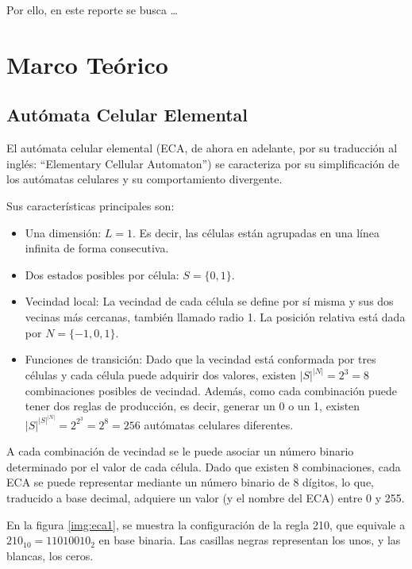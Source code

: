 \documentclass[12pt,twoside]{article}
\begin{document}
	Por ello, en este reporte se busca \dots
	
	\clearpage
	\section{Marco Teórico}
	
	\subsection{Autómata Celular Elemental}
	
	El autómata celular elemental (ECA, de ahora en adelante, por su traducción al inglés: ``Elementary Cellular Automaton'') se caracteriza por su simplificación de los autómatas celulares y su comportamiento divergente.
	
	Sus características principales son:
	\begin{itemize}
		\item Una dimensión: $L = 1$. Es decir, las células están agrupadas en una línea infinita de forma consecutiva.
		
		\item Dos estados posibles por célula: $S = \{0, 1\}$.  
		
		\item Vecindad local: La vecindad de cada célula se define por sí misma y sus dos vecinas más cercanas, también llamado radio 1. La posición relativa está dada por $N = \{-1, 0, 1\}$.  
		
		\item Funciones de transición: Dado que la vecindad está conformada por tres células y cada célula puede adquirir dos valores, existen $|S|^{|N|} = 2^3 = 8$ combinaciones posibles de vecindad. Además, como cada combinación puede tener dos reglas de producción, es decir, generar un 0 o un 1, existen $|S|^{|S|^{|N|}} = 2^{2^3} = 2^8 = 256$ autómatas celulares diferentes.  
		
	\end{itemize}
	
	A cada combinación de vecindad se le puede asociar un número binario determinado por el valor de cada célula. Dado que existen 8 combinaciones, cada ECA se puede representar mediante un número binario de 8 dígitos, lo que, traducido a base decimal, adquiere un valor (y el nombre del ECA) entre 0 y 255.
	
	En la figura \ref{img:eca1}, se muestra la configuración de la regla 210, que equivale a $210_{10} = 11010010_2$ en base binaria. Las casillas negras representan los unos, y las blancas, los ceros.
	
\end{document}
